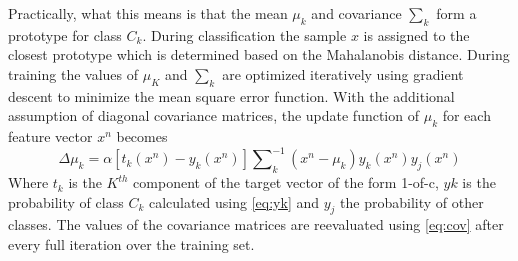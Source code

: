 \documentclass[12pt, a4paper, fleqn]{memoir}%
\begin{document}
Practically, what this means is that the mean $\mu_k$ and covariance $\sum_k$ form a prototype for class $C_k$. During classification the sample $x$ is assigned to the closest prototype which is determined based on the Mahalanobis distance. During training the values of $\mu_K$ and $\sum_k$ are optimized iteratively using gradient descent to minimize the mean square error function. With the additional assumption of diagonal covariance matrices, the update function of $\mu_k$ for each feature vector $x^n$ becomes
\begin{equation} \label{eq:deltamu}
	\Delta \mu_k = \alpha[t_k(x^n)-y_k(x^n)]\sum\nolimits_k^{-1}(x^n-\mu_k)y_k(x^n)y_j(x^n)
\end{equation}
Where $t_k$ is the $K^{th}$ component of the target vector of the form 1-of-c, $yk$ is the probability of class $C_k$ calculated using \ref{eq:yk} and $y_j$ the probability of other classes. The values of the covariance matrices are reevaluated using \ref{eq:cov} after every full iteration over the training set.
\end{document}
